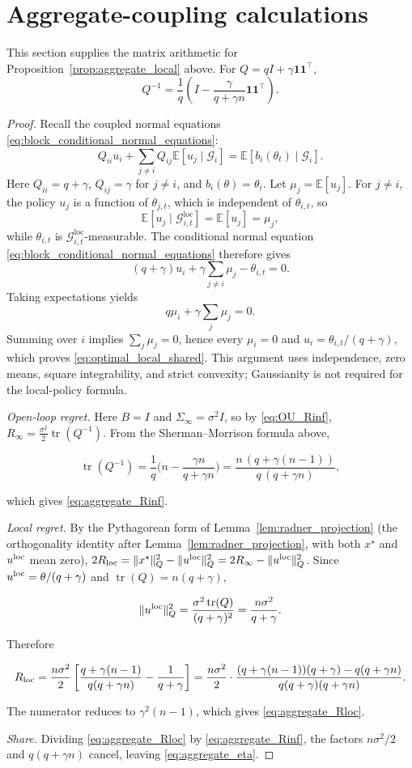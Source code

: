\section{Aggregate-coupling calculations}
\label{app:technical-aggregate}
This section supplies the matrix arithmetic for Proposition~\ref{prop:aggregate_local}
above. For $Q=qI+\gamma\mathbf1\mathbf1^\top$,
\[
Q^{-1}=\frac1q\left(I-\frac{\gamma}{q+\gamma n}\mathbf1\mathbf1^\top\right).
\]
\begin{proof}
Recall the coupled normal equations \eqref{eq:block_conditional_normal_equations}:
\[
 Q_{ii}u_i+\sum_{j\ne i}Q_{ij}\mathbb E[u_j\mid\mathcal G_i]
 =\mathbb E[b_i(\theta_t)\mid\mathcal G_i].
\]
Here $Q_{ii}=q+\gamma$, $Q_{ij}=\gamma$ for $j\ne i$, and $b_i(\theta)=\theta_i$.
Let $\mu_j=\mathbb E[u_j]$. For $j\ne i$, the policy $u_j$ is a function of $\theta_{j,t}$,
which is independent of $\theta_{i,t}$, so
\[
\mathbb E[u_j\mid\mathcal G^{\mathrm{loc}}_{i,t}]
=\mathbb E[u_j]=\mu_j,
\]
while $\theta_{i,t}$ is
$\mathcal G^{\mathrm{loc}}_{i,t}$-measurable. The conditional normal equation
\eqref{eq:block_conditional_normal_equations} therefore gives
\[
(q+\gamma)u_i
+\gamma\sum_{j\ne i}\mu_j
-\theta_{i,t}=0.
\]
Taking expectations yields
\[
q\mu_i+\gamma\sum_j\mu_j=0.
\]
Summing over $i$ implies $\sum_j\mu_j=0$, hence every $\mu_i=0$ and
$u_i=\theta_{i,t}/(q+\gamma)$, which proves
\eqref{eq:optimal_local_shared}. This argument uses independence, zero means,
square integrability, and strict convexity; Gaussianity is not required for the
local-policy formula.

\emph{Open-loop regret.} Here $B=I$ and $\Sigma_\infty=\sigma^2I$, so by \eqref{eq:OU_Rinf}, $R_\infty=\tfrac{\sigma^2}2\operatorname{tr}(Q^{-1})$. From the Sherman--Morrison formula above,

\[
\operatorname{tr}(Q^{-1})=\frac1q\Big(n-\frac{\gamma n}{q+\gamma n}\Big)=\frac{n\,(q+\gamma(n-1))}{q\,(q+\gamma n)},
\]

which gives \eqref{eq:aggregate_Rinf}.

\emph{Local regret.} By the Pythagorean form of Lemma~\ref{lem:radner_projection} (the orthogonality identity after Lemma~\ref{lem:radner_projection}, with both $x^\star$ and $u^{\rm loc}$ mean zero), $2R_{\rm loc}=\|x^\star\|_Q^2-\|u^{\rm loc}\|_Q^2=2R_\infty-\|u^{\rm loc}\|_Q^2$. Since $u^{\rm loc}=\theta/(q+\gamma)$ and $\operatorname{tr}(Q)=n(q+\gamma)$,

\[
\|u^{\rm loc}\|_Q^2=\frac{\sigma^2\operatorname{tr}(Q)}{(q+\gamma)^2}=\frac{n\sigma^2}{q+\gamma}.
\]

Therefore

\[
R_{\rm loc}=\frac{n\sigma^2}{2}\left[\frac{q+\gamma(n-1)}{q(q+\gamma n)}-\frac{1}{q+\gamma}\right]=\frac{n\sigma^2}{2}\cdot\frac{(q+\gamma(n-1))(q+\gamma)-q(q+\gamma n)}{q(q+\gamma)(q+\gamma n)} .
\]

The numerator reduces to $\gamma^2(n-1)$, which gives \eqref{eq:aggregate_Rloc}.

\emph{Share.} Dividing \eqref{eq:aggregate_Rloc} by \eqref{eq:aggregate_Rinf}, the factors $n\sigma^2/2$ and $q(q+\gamma n)$ cancel, leaving \eqref{eq:aggregate_eta}.

\end{proof}

